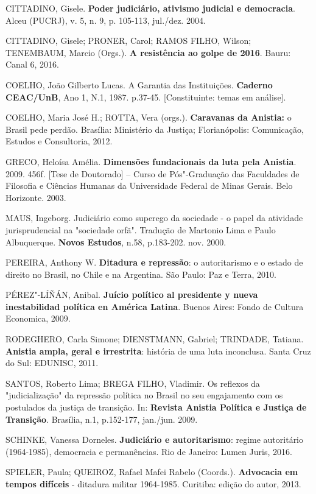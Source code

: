 CITTADINO, Gisele. \textbf{Poder judiciário, ativismo judicial e
democracia}. Alceu (PUCRJ), v. 5, n. 9, p. 105-113, jul./dez. 2004.

CITTADINO, Gisele; PRONER, Carol; RAMOS FILHO, Wilson; TENEMBAUM, Marcio
(Orgs.). \textbf{A resistência ao golpe de 2016}. Bauru: Canal 6, 2016.

COELHO, João Gilberto Lucas. A Garantia das Instituições.
\textbf{Caderno CEAC/UnB}, Ano 1, N.1, 1987. p.37-45. {[}Constituinte:
temas em análise{]}.

COELHO, Maria José H.; ROTTA, Vera (orgs.). \textbf{Caravanas da
Anistia:} o Brasil pede perdão. Brasília: Ministério da Justiça;
Florianópolis: Comunicação, Estudos e Consultoria, 2012.

GRECO, Heloísa Amélia. \textbf{Dimensões fundacionais da luta pela
Anistia}. 2009. 456f. {[}Tese de Doutorado{]} -- Curso de Pós"-Graduação
das Faculdades de Filosofia e Ciências Humanas da Universidade Federal
de Minas Gerais. Belo Horizonte. 2003.

MAUS, Ingeborg. Judiciário como superego da sociedade - o papel da
atividade jurisprudencial na "sociedade orfã". Tradução de Martonio Lima
e Paulo Albuquerque. \textbf{Novos Estudos}, n.58, p.183-202. nov. 2000.

PEREIRA, Anthony W. \textbf{Ditadura e repressão}: o autoritarismo e o
estado de direito no Brasil, no Chile e na Argentina. São Paulo: Paz e
Terra, 2010.

PÉREZ"-LÍÑÁN, Anibal. \textbf{Juício político al presidente y nueva
inestabilidad política en América Latina}. Buenos Aires: Fondo de
Cultura Economica, 2009.

RODEGHERO, Carla Simone; DIENSTMANN, Gabriel; TRINDADE, Tatiana.
\textbf{Anistia ampla, geral e irrestrita}: história de uma luta
inconclusa. Santa Cruz do Sul: EDUNISC, 2011.

SANTOS, Roberto Lima; BREGA FILHO, Vladimir. Os reflexos da
"judicialização" da repressão política no Brasil no seu engajamento com
os postulados da justiça de transição. In: \textbf{Revista Anistia
Política e Justiça de Transição}. Brasília, n.1, p.152-177, jan./jun.
2009.

SCHINKE, Vanessa Dorneles. \textbf{Judiciário e autoritarismo}: regime
autoritário (1964-1985), democracia e permanências. Rio de Janeiro:
Lumen Juris, 2016.

SPIELER, Paula; QUEIROZ, Rafael Mafei Rabelo (Coords.).
\textbf{Advocacia em tempos difíceis} - ditadura militar 1964-1985.
Curitiba: edição do autor, 2013.

